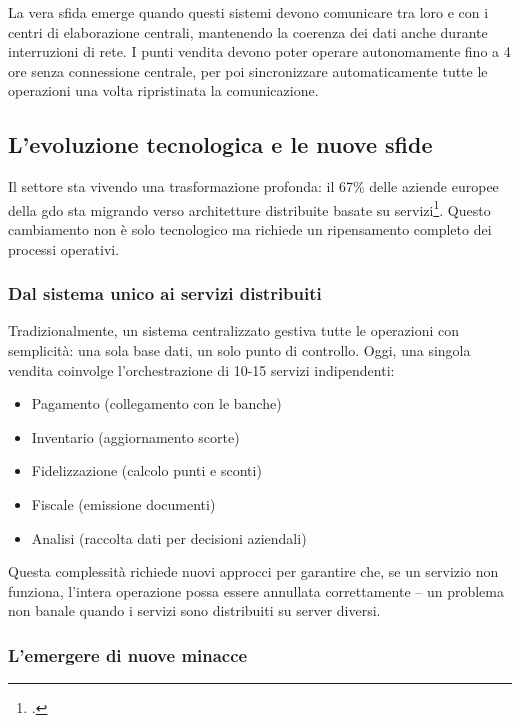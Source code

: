 La vera sfida emerge quando questi sistemi devono comunicare tra loro e con i centri di elaborazione centrali, mantenendo la coerenza dei dati anche durante interruzioni di rete. I punti vendita devono poter operare autonomamente fino a 4 ore senza connessione centrale, per poi sincronizzare automaticamente tutte le operazioni una volta ripristinata la comunicazione.

\subsection{\texorpdfstring{L'evoluzione tecnologica e le nuove sfide}{1.1.2 - L'evoluzione tecnologica e le nuove sfide}}
\label{subsec:evoluzione_sfide}

Il settore sta vivendo una trasformazione profonda: il 67\% delle aziende europee della \gls{gdo} sta migrando verso architetture distribuite basate su servizi\footcite{gartner2024cloud}. Questo cambiamento non è solo tecnologico ma richiede un ripensamento completo dei processi operativi.

\subsubsection{\texorpdfstring{Dal sistema unico ai servizi distribuiti}{1.1.2.1 - Dal sistema unico ai servizi distribuiti}}
\label{subsubsec:servizi_distribuiti}

Tradizionalmente, un sistema centralizzato gestiva tutte le operazioni con semplicità: una sola base dati, un solo punto di controllo. Oggi, una singola vendita coinvolge l'orchestrazione di 10-15 servizi indipendenti:

\begin{itemize}
\item Pagamento (collegamento con le banche)
\item Inventario (aggiornamento scorte)
\item Fidelizzazione (calcolo punti e sconti)
\item Fiscale (emissione documenti)
\item Analisi (raccolta dati per decisioni aziendali)
\end{itemize}

Questa complessità richiede nuovi approcci per garantire che, se un servizio non funziona, l'intera operazione possa essere annullata correttamente – un problema non banale quando i servizi sono distribuiti su server diversi.

\subsubsection{\texorpdfstring{L'emergere di nuove minacce}{1.1.2.2 - L'emergere di nuove minacce}}
\label{subsubsec:nuove_minacce}

